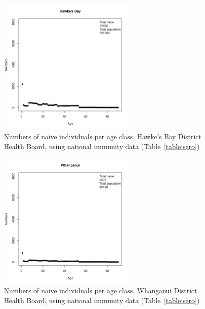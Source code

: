 \documentclass{article}
\begin{document}
\begin{figure}[H]
     \begin{center}
     \includegraphics[width=0.6\textwidth]{dhb10.pdf}
     \end{center}
     \caption{Numbers of naive individuals per age class, Hawke's Bay District Health Board, using national immunity data (Table~\ref{table:sero})}
     \label{fig:HawkesBay}
\end{figure}

\begin{figure}[H]
     \begin{center}
     \includegraphics[width=0.6\textwidth]{dhb11.pdf}
     \end{center}
     \caption{Numbers of naive individuals per age class, Whanganui District Health Board, using national immunity data (Table~\ref{table:sero})}
     \label{fig:Whanganui}
\end{figure}
\end{document}
